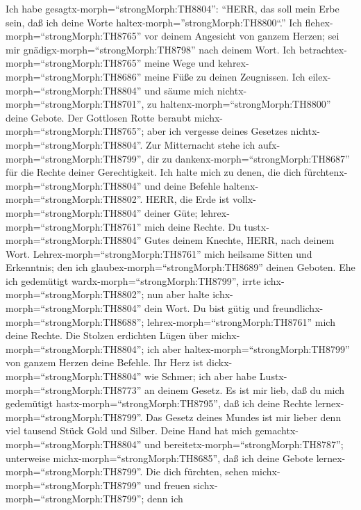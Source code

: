  Ich habe gesagtx-morph=``strongMorph:TH8804'': ``HERR, das
soll mein Erbe sein, daß ich deine Worte
haltex-morph=''strongMorph:TH8800``.''  Ich
flehex-morph=``strongMorph:TH8765'' vor deinem Angesicht von ganzem
Herzen; sei mir gnädigx-morph=``strongMorph:TH8798'' nach deinem Wort.
 Ich betrachtex-morph=``strongMorph:TH8765'' meine Wege und
kehrex-morph=``strongMorph:TH8686'' meine Füße zu deinen Zeugnissen.
 Ich eilex-morph=``strongMorph:TH8804'' und säume mich
nichtx-morph=``strongMorph:TH8701'', zu
haltenx-morph=``strongMorph:TH8800'' deine Gebote.  Der
Gottlosen Rotte beraubt michx-morph=``strongMorph:TH8765''; aber ich
vergesse deines Gesetzes nichtx-morph=``strongMorph:TH8804''.
 Zur Mitternacht stehe ich
aufx-morph=``strongMorph:TH8799'', dir zu
dankenx-morph=``strongMorph:TH8687'' für die Rechte deiner
Gerechtigkeit.  Ich halte mich zu denen, die dich
fürchtenx-morph=``strongMorph:TH8804'' und deine Befehle
haltenx-morph=``strongMorph:TH8802''.  HERR, die Erde ist
vollx-morph=``strongMorph:TH8804'' deiner Güte;
lehrex-morph=``strongMorph:TH8761'' mich deine Rechte.  Du
tustx-morph=``strongMorph:TH8804'' Gutes deinem Knechte, HERR, nach
deinem Wort.  Lehrex-morph=``strongMorph:TH8761'' mich
heilsame Sitten und Erkenntnis; den ich
glaubex-morph=``strongMorph:TH8689'' deinen Geboten.  Ehe
ich gedemütigt wardx-morph=``strongMorph:TH8799'', irrte
ichx-morph=``strongMorph:TH8802''; nun aber halte
ichx-morph=``strongMorph:TH8804'' dein Wort.  Du bist gütig
und freundlichx-morph=``strongMorph:TH8688'';
lehrex-morph=``strongMorph:TH8761'' mich deine Rechte.  Die
Stolzen erdichten Lügen über michx-morph=``strongMorph:TH8804''; ich
aber haltex-morph=``strongMorph:TH8799'' von ganzem Herzen deine
Befehle.  Ihr Herz ist dickx-morph=``strongMorph:TH8804''
wie Schmer; ich aber habe Lustx-morph=``strongMorph:TH8773'' an deinem
Gesetz.  Es ist mir lieb, daß du mich gedemütigt
hastx-morph=``strongMorph:TH8795'', daß ich deine Rechte
lernex-morph=``strongMorph:TH8799''.  Das Gesetz deines
Mundes ist mir lieber denn viel tausend Stück Gold und Silber.
 Deine Hand hat mich gemachtx-morph=``strongMorph:TH8804''
und bereitetx-morph=``strongMorph:TH8787''; unterweise
michx-morph=``strongMorph:TH8685'', daß ich deine Gebote
lernex-morph=``strongMorph:TH8799''.  Die dich fürchten,
sehen michx-morph=``strongMorph:TH8799'' und freuen
sichx-morph=``strongMorph:TH8799''; denn ich
